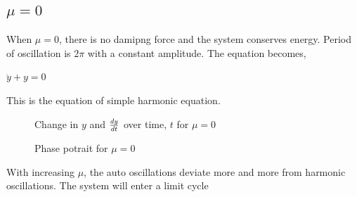\documentclass{article}
\begin{document}
\subsection{$\mu=0$}
When $\mu=0$, there is no damipng force and the system conserves energy. Period of oscillation is $2\pi$ with a constant amplitude. The equation becomes, 
\begin{center}
$\ddot{y}+y=0$
\end{center}
This is the equation of simple harmonic equation.
\begin{figure}[H]
\centering 
\noindent{}%
\caption{Change in $y$ and $dy \over dt$  over time, $t$ for $\mu=0$}
\end{figure}
\begin{figure}[H]
\centering 
\noindent{}%
\caption{Phase potrait for $\mu=0$}
\end{figure}
With increasing $\mu$, the auto oscillations deviate more and more from harmonic oscillations. The system will enter a limit cycle
\end{document}
